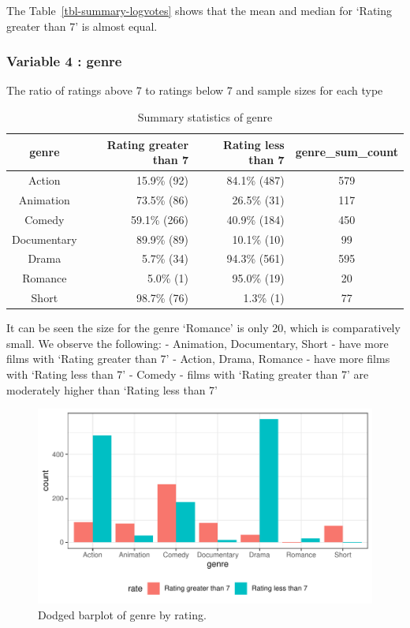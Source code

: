 \documentclass[
  letterpaper,
  DIV=11,
  numbers=noendperiod]{scrartcl}
\begin{document}
The Table~\ref{tbl-summary-logvotes} shows that the mean and median for
`Rating greater than 7' is almost equal.

\clearpage

\hypertarget{variable-4-genre}{%
\subsubsection{Variable 4 : genre}\label{variable-4-genre}}

The ratio of ratings above 7 to ratings below 7 and sample sizes for
each type

\hypertarget{tbl-summary-genre}{}
\begin{longtable}{crrc}
\caption{\label{tbl-summary-genre}Summary statistics of genre }\tabularnewline

\toprule
genre & Rating greater than 7 & Rating less than 7 & genre\_sum\_count \\ 
\midrule\addlinespace[2.5pt]
Action & 15.9\%  (92) & 84.1\% (487) & 579 \\ 
Animation & 73.5\%  (86) & 26.5\%  (31) & 117 \\ 
Comedy & 59.1\% (266) & 40.9\% (184) & 450 \\ 
Documentary & 89.9\%  (89) & 10.1\%  (10) & 99 \\ 
Drama & 5.7\%  (34) & 94.3\% (561) & 595 \\ 
Romance & 5.0\%   (1) & 95.0\%  (19) & 20 \\ 
Short & 98.7\%  (76) & 1.3\%   (1) & 77 \\ 
\bottomrule
\end{longtable}

It can be seen the size for the genre `Romance' is only 20, which is
comparatively small. We observe the following: - Animation, Documentary,
Short - have more films with `Rating greater than 7' - Action, Drama,
Romance - have more films with `Rating less than 7' - Comedy - films
with `Rating greater than 7' are moderately higher than `Rating less
than 7'

\begin{figure}

{\centering \includegraphics{Group_06_Analysis_files/figure-pdf/fig-dodgedbarplot-genre-1.pdf}

}

\caption{\label{fig-dodgedbarplot-genre}Dodged barplot of genre by
rating.}

\end{figure}
\end{document}

